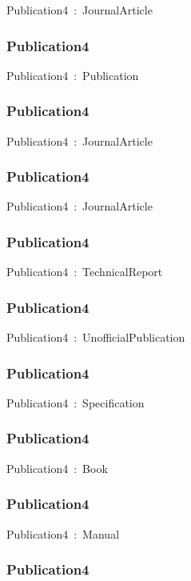 \documentclass{article}
\begin{document}
Publication4~:~JournalArticle

\subsubsection*{Publication4}

Publication4~:~Publication

\subsubsection*{Publication4}

Publication4~:~JournalArticle

\subsubsection*{Publication4}

Publication4~:~JournalArticle

\subsubsection*{Publication4}

Publication4~:~TechnicalReport

\subsubsection*{Publication4}

Publication4~:~UnofficialPublication

\subsubsection*{Publication4}

Publication4~:~Specification

\subsubsection*{Publication4}

Publication4~:~Book

\subsubsection*{Publication4}

Publication4~:~Manual

\subsubsection*{Publication4}
\end{document}
